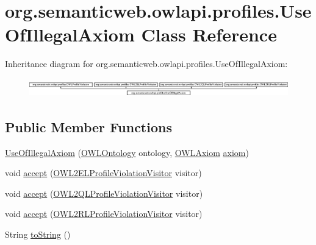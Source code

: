 \hypertarget{classorg_1_1semanticweb_1_1owlapi_1_1profiles_1_1_use_of_illegal_axiom}{\section{org.\-semanticweb.\-owlapi.\-profiles.\-Use\-Of\-Illegal\-Axiom Class Reference}
\label{classorg_1_1semanticweb_1_1owlapi_1_1profiles_1_1_use_of_illegal_axiom}
}
Inheritance diagram for org.\-semanticweb.\-owlapi.\-profiles.\-Use\-Of\-Illegal\-Axiom\-:\begin{figure}[H]
\begin{center}
\leavevmode
\includegraphics[height=0.816327cm]{classorg_1_1semanticweb_1_1owlapi_1_1profiles_1_1_use_of_illegal_axiom}
\end{center}
\end{figure}
\subsection*{Public Member Functions}
\begin{DoxyCompactItemize}
\item 
\hyperlink{classorg_1_1semanticweb_1_1owlapi_1_1profiles_1_1_use_of_illegal_axiom_a2c2afce43d25c5b9a11553a3655e0c67}{Use\-Of\-Illegal\-Axiom} (\hyperlink{interfaceorg_1_1semanticweb_1_1owlapi_1_1model_1_1_o_w_l_ontology}{O\-W\-L\-Ontology} ontology, \hyperlink{interfaceorg_1_1semanticweb_1_1owlapi_1_1model_1_1_o_w_l_axiom}{O\-W\-L\-Axiom} \hyperlink{classorg_1_1semanticweb_1_1owlapi_1_1profiles_1_1_o_w_l_profile_violation_aa7c8e8910ed3966f64a2c003fb516214}{axiom})
\item 
void \hyperlink{classorg_1_1semanticweb_1_1owlapi_1_1profiles_1_1_use_of_illegal_axiom_ac716b38b80f413dff770651cb4c2de83}{accept} (\hyperlink{interfaceorg_1_1semanticweb_1_1owlapi_1_1profiles_1_1_o_w_l2_e_l_profile_violation_visitor}{O\-W\-L2\-E\-L\-Profile\-Violation\-Visitor} visitor)
\item 
void \hyperlink{classorg_1_1semanticweb_1_1owlapi_1_1profiles_1_1_use_of_illegal_axiom_a1eefc81364b3f308639aa00b992b8025}{accept} (\hyperlink{interfaceorg_1_1semanticweb_1_1owlapi_1_1profiles_1_1_o_w_l2_q_l_profile_violation_visitor}{O\-W\-L2\-Q\-L\-Profile\-Violation\-Visitor} visitor)
\item 
void \hyperlink{classorg_1_1semanticweb_1_1owlapi_1_1profiles_1_1_use_of_illegal_axiom_ac9ca566224e3ba8ebf82d2a2524d6bcf}{accept} (\hyperlink{interfaceorg_1_1semanticweb_1_1owlapi_1_1profiles_1_1_o_w_l2_r_l_profile_violation_visitor}{O\-W\-L2\-R\-L\-Profile\-Violation\-Visitor} visitor)
\item 
String \hyperlink{classorg_1_1semanticweb_1_1owlapi_1_1profiles_1_1_use_of_illegal_axiom_a5e9944f38b6eb2b1e2686b8675259f79}{to\-String} ()
\end{DoxyCompactItemize}


